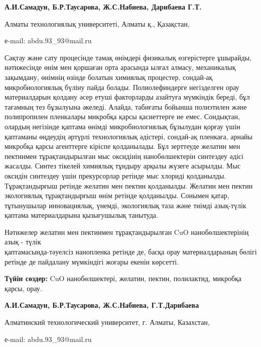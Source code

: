 \begin{center}
{\bfseries А.И.Самадун, Б.Р.Таусарова, Ж.С.Набиева, Дарибаева Г.Т.}

Алматы технологиялық университеті, Алматы қ., Қазақстан,

е-mail: abdu.93\_93@mail.ru
\end{center}

Сақтау және сату процесінде тамақ өнімдері физикалық өзгерістерге
ұшырайды, нәтижесінде өнім мен қоршаған орта арасында ылғал алмасу,
механикалық зақымдану, өнімнің өзінде болатын химиялық процестер,
сондай-ақ микробиологиялық бүліну пайда болады. Полиолефиндерге
негізделген орау материалдарын қолдану әсер етуші факторларды азайтуға
мүмкіндік береді, бұл тағамның тез бұзылуына әкеледі. Алайда, табиғаты
бойынша полиэтилен және полипропилен пленкалары микробқа қарсы
қасиеттерге ие емес. Сондықтан, олардың негізінде қаптама өнімді
микробиологиялық бұзылудан қорғау үшін қаптаманы өңдеудің әртүрлі
технологиялық әдістері, сондай-ақ пленкаға, арнайы микробқа қарсы
агенттерге кіріспе қолданылады. Бұл зерттеуде желатин мен пектинмен
тұрақтандырылған мыс оксидінің нанобөлшектерін синтездеу әдісі жасалды.
Синтез тікелей химиялық тұндыру арқылы жүзеге асырылды. Мыс оксидін
синтездеу үшін прекурсорлар ретінде мыс хлориді қолданылды.
Тұрақтандырғыш ретінде желатин мен пектин қолданылды. Желатин мен пектин
экологиялық тұрақтандырғыш өнім ретінде қолданылды. Сонымен қатар,
тұтынушылар инновациялық, үнемді, экологиялық таза және тиімді
азық-түлік қаптама материалдарына қызығушылық танытуда.

Нәтижелер желатин мен пектинмен тұрақтандырылған CuO нанобөлшектерінің
азық - түлік \\қаптамасында-тәуелсіз нанопленка ретінде де, басқа орау
материалдарының бөлігі ретінде де пайдалану мүмкіндігі жоғары екенін
көрсетті.

{\bfseries Түйін сөздер:} CuO нанобөлшектері, желатин, пектин, полилактид,
микробқа қарсы, орау.


\begin{center}
{\bfseries А.И.Самадун, Б.Р.Таусарова, Ж.С.Набиева, Г.Т.Дарибаева}

Алматинский технологический университет, г. Алматы, Казахстан,

е-mail: abdu.93\_93@mail.ru
\end{center}

